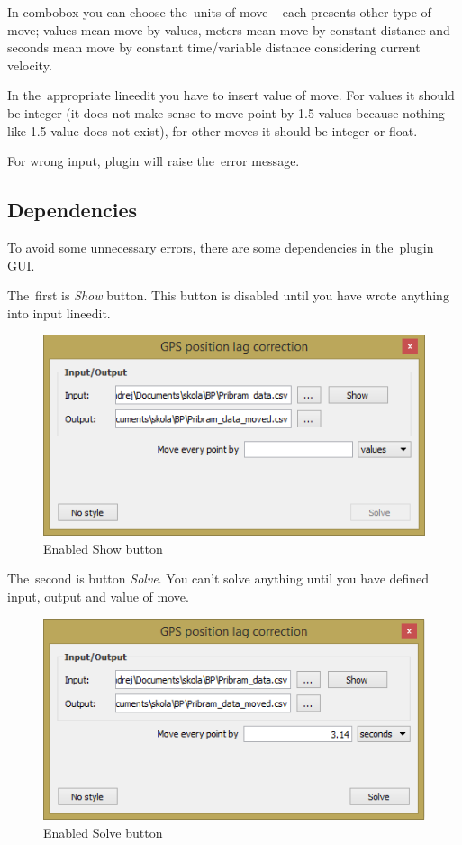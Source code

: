 In combobox you can choose the~units of move – each presents other type of move; values mean move
by values, meters mean move by constant distance and seconds mean move by constant time/variable
distance considering current velocity. 

In the~appropriate lineedit you have to insert value of move. For values it should be integer (it
does not make sense to move point by 1.5 values because nothing like 1.5 value does not exist), for
other moves it should be integer or float. 

For wrong input, plugin will raise the~error message. 

\subsection{Dependencies}
\label{dependencies}

To avoid some unnecessary errors, there are some dependencies in the~plugin GUI. 

The~first is \textit{Show} button. This button is
disabled until you have wrote anything into input lineedit. 

  \begin{figure}[H]
   \centering
	\includegraphics[scale=0.75]{./pictures/show.png}
	\caption[Enabled Show button]{Enabled Show button}
      \label{fig:show}
  \end{figure}

The~second is button \textit{Solve}. You can’t solve anything until you have defined input, output and
value of move.

  \begin{figure}[H]
   \centering
	\includegraphics[scale=0.75]{./pictures/solve.png}
	\caption[Enabled Solve button]{Enabled Solve button}
      \label{fig:solve}
  \end{figure}

